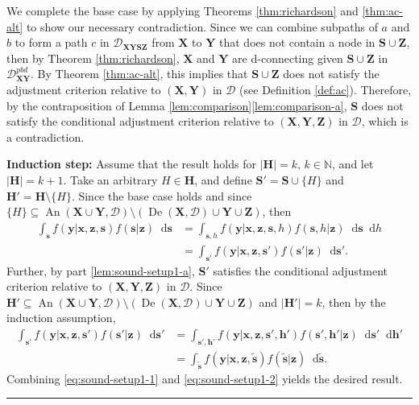\documentclass[twoside]{article}
\DeclareMathOperator{\An}{An}
\DeclareMathOperator{\De}{De}
\newcommand{\gpbd}[2][G]{\mathcal{#1}_{\mb{#2}}^{pbd}}
\newcommand{\mb}[1]{\mathbf{#1}}
\newcommand{\g}[1][G]{\mathcal{#1}}
\newcommand*\diff{\mathop{}\!\mathrm{d}}
\newenvironment{proofof}[1][]{\begin{trivlist}
\item[\hskip \labelsep {\bfseries Proof of #1.}]}{\hfill\BlackBox\end{trivlist}}
\newcommand{\BlackBox}{\rule{1.5ex}{1.5ex}}
\begin{document}
\begin{proofof}[Lemma \ref{lem:sound-setup1}]
    We complete the base case by applying Theorems \ref{thm:richardson} and \ref{thm:ac-alt} to show our necessary contradiction. Since we can combine subpaths of $a$ and $b$ to form a path $c$ in $\g[D]_{\mb{XYSZ}}$ from $\mb{X}$ to $\mb{Y}$ that does not contain a node in $\mb{S} \cup \mb{Z}$, then by Theorem \ref{thm:richardson}, $\mb{X}$ and $\mb{Y}$ are d-connecting given $\mb{S} \cup \mb{Z}$ in $\gpbd[D]{XY}$. By Theorem \ref{thm:ac-alt}, this implies that $\mb{S} \cup \mb{Z}$ does not satisfy the adjustment criterion relative to $(\mb{X,Y})$ in $\g[D]$ (see Definition \ref{def:ac}). Therefore, by the contraposition of Lemma \ref{lem:comparison}\ref{lem:comparison-a}, $\mb{S}$ does not satisfy the conditional adjustment criterion relative to $(\mb{X,Y,Z})$ in $\g[D]$, which is a contradiction.




    \textbf{Induction step:} Assume that the result holds for $|\mb{H}| = k$, $k \in \mathbb{N}$, and let $|\mb{H}| = k+1$. Take an arbitrary $H \in \mb{H}$, and define $\mb{S'} = \mb{S} \cup \{H\}$ and $\mb{H'} = \mb{H} \setminus \{H\}$. Since the base case holds and since $\{H\} \subseteq \An(\mb{X} \cup \mb{Y},\g[D]) \setminus (\De(\mb{X}, \g[D]) \cup \mb{Y} \cup \mb{Z})$, then
    \begin{align}
        \int_\mb{s} f(\mb{y} | \mb{x,z,s})f(\mb{s} | \mb{z})  \diff \mb{s}
                &= \int_{\mb{s},h} f(\mb{y} | \mb{x,z,s},h) f(\mb{s},h | \mb{z})  \diff \mb{s} \diff h \nonumber \\
                &= \int_{\mb{s'}} f(\mb{y} | \mb{x,z,s'}) f(\mb{s'} | \mb{z})  \diff \mb{s'}. \label{eq:sound-setup1-1}
    \end{align}
    Further, by part \ref{lem:sound-setup1-a}, $\mb{S'}$ satisfies the conditional adjustment criterion relative to $(\mb{X,Y,Z})$ in $\g[D]$. Since $\mb{H'} \subseteq \An(\mb{X} \cup \mb{Y},\g[D]) \setminus (\De(\mb{X}, \g[D]) \cup \mb{Y} \cup \mb{Z})$ and $|\mb{H'}| = k$, then by the induction assumption,
    \begin{align}
        \int_\mb{s'} f(\mb{y} | \mb{x,z,s'})f(\mb{s'} | \mb{z})  \diff \mb{s'} 
            &= \int_{\mb{s',h'}} f(\mb{y} | \mb{x,z,s',h'}) f(\mb{s',h'} | \mb{z})  \diff \mb{s'} \diff \mb{h'} \nonumber \\
            &= \int_{\mb{\tilde{s}}} f(\mb{y} | \mb{x,z,\tilde{s}}) f(\mb{\tilde{s}} | \mb{z}) \diff \mb{\tilde{s}}. \label{eq:sound-setup1-2}
    \end{align}    
    Combining \eqref{eq:sound-setup1-1} and \eqref{eq:sound-setup1-2} yields the desired result.
\end{proofof}
\end{document}
